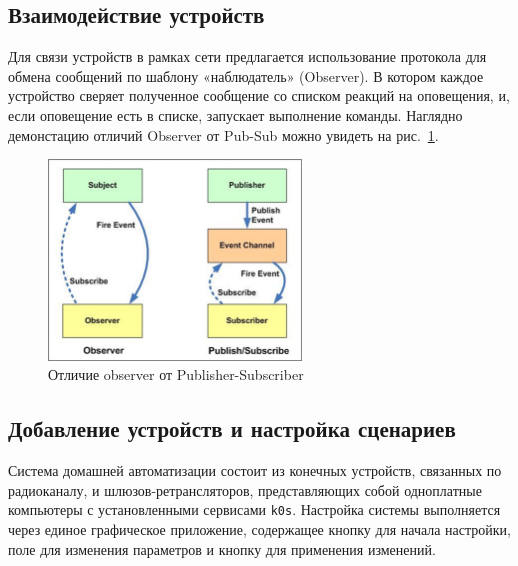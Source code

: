 \documentclass[a4paper,12pt]{article}
\begin{document}
\subsection{Взаимодействие устройств}
Для связи устройств в рамках сети предлагается использование протокола для обмена сообщений по шаблону «наблюдатель» (Observer). В котором каждое устройство сверяет полученное сообщение со списком реакций на оповещения, и, если оповещение есть в списке, запускает выполнение команды. Наглядно демонстацию отличий Observer от Pub-Sub можно увидеть на рис.~\ref{fig:Observer_vs_pub_sub}.

\begin{figure}[h]
    \centering
    \includegraphics[width=0.6\textwidth]{images/Fig08.png}
    \caption{Отличие observer от Publisher-Subscriber \cite{IMG_observer_vs_pub_sub}}
    \label{fig:Observer_vs_pub_sub}
\end{figure}

\subsection{Добавление устройств и настройка сценариев}

Система домашней автоматизации состоит из конечных устройств, связанных по радиоканалу, и шлюзов-ретрансляторов, представляющих собой одноплатные компьютеры с установленными сервисами \texttt{k0s}. Настройка системы выполняется через единое графическое приложение, содержащее кнопку для начала настройки, поле для изменения параметров и кнопку для применения изменений.
\end{document}
